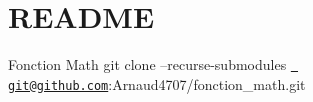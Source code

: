 \chapter{README}
\hypertarget{md_README}{}\label{md_README}
Fonction Math git clone --recurse-\/submodules \href{mailto:git@github.com}{\texttt{ git@github.\+com}}\+:Arnaud4707/fonction\+\_\+math.\+git 